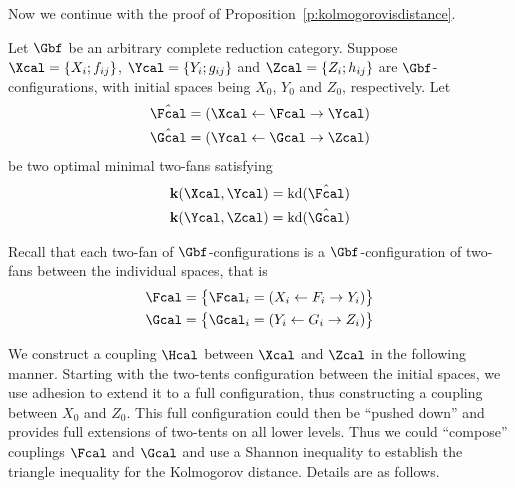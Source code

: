 \begin{Proof}
  Now we continue with the proof of
  Proposition~\ref{p:kolmogorovisdistance}.

  Let $\Gbf$ be an arbitrary complete reduction category.
  Suppose $\Xcal = \set{X_i ; f_{ij}}$, $\Ycal = \set{Y_i; g_{ij}}$
  and $\Zcal = \set{Z_i; h_{ij}}$ are $\Gbf$-configurations, with
  initial spaces being $X_{0}$, $Y_{0}$ and $Z_{0}$, respectively. Let
  \begin{align*}
    \hat\Fcal
    &=
    (\Xcal\ot\Fcal\to\Ycal)
    \\
    \hat\Gcal
    &=
    (\Ycal\ot\Gcal\to\Zcal)
  \end{align*}
  be two optimal minimal two-fans
  satisfying
  \begin{align*} 
    \ikd(\Xcal, \Ycal)
    &= 
    \kd(\hat\Fcal) 
    \\ 
    \ikd(\Ycal,\Zcal)
    &= 
    \kd(\hat\Gcal) 
  \end{align*}
   
  Recall that each two-fan of $\Gbf$-configurations is a
  $\Gbf$-configuration of two-fans between the individual spaces, that
  is 
  \[ 
  \begin{split} 
    \Fcal 
    &= 
    \set{\rule{0em}{2ex} \Fcal_i = (X_i \ot F_i \to Y_i)} 
    \\ 
    \Gcal 
    &= 
    \set{ \rule{0em}{2ex} \Gcal_i = (Y_i \ot G_i \to Z_i)} 
  \end{split} 
  \] 

  We construct a coupling $\Hcal$ between $\Xcal$ and $\Zcal$ in the following
  manner. Starting with the two-tents configuration between the
  initial spaces, we use adhesion to extend it to a full
  configuration, thus constructing a coupling between $X_{0}$ and
  $Z_{0}$. This full configuration could then be ``pushed down'' and
  provides full extensions of two-tents on all lower levels. Thus we
  could ``compose'' couplings $\Fcal$ and $\Gcal$ and use a Shannon
  inequality to establish the triangle inequality for the Kolmogorov
  distance. Details are as follows. 
  

\end{Proof}
